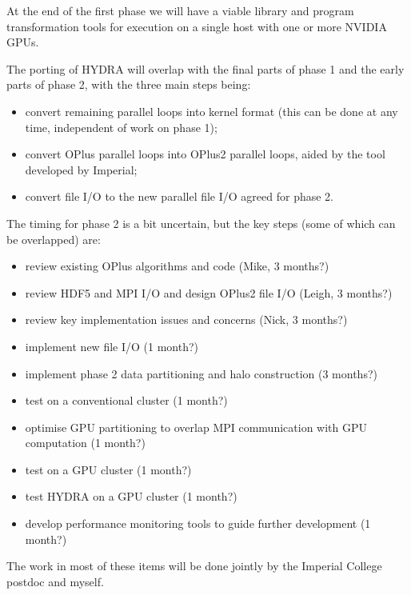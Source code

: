 \documentclass[12pt]{article}
\begin{document}

At the end of the first phase we will have a viable library 
and program transformation tools for execution on a single host 
with one or more NVIDIA GPUs.  

The porting of HYDRA will overlap with the final parts of phase 1 
and the early parts of phase 2, with the three main steps being:
\begin{itemize}
\item
convert remaining parallel loops into kernel format
(this can be done at any time, independent of work on phase 1);

\item
convert OPlus parallel loops into OPlus2 parallel loops,
aided by the tool developed by Imperial;

\item
convert file I/O to the new parallel file I/O agreed for phase 2.
\end{itemize}

\noindent
The timing for phase 2 is a bit uncertain, but the key steps 
(some of which can be overlapped) are:
\begin{itemize}
\item
review existing OPlus algorithms and code (Mike, 3 months?)

\item
review HDF5 and MPI I/O and design OPlus2 file I/O (Leigh, 3 months?)

\item
review key implementation issues and concerns (Nick, 3 months?)

\item
implement new file I/O (1 month?)

\item
implement phase 2 data partitioning and halo construction 
(3 months?)

\item
test on a conventional cluster (1 month?)

\item
optimise GPU partitioning to overlap MPI communication with GPU 
computation (1 month?)

\item
test on a GPU cluster (1 month?)

\item
test HYDRA on a GPU cluster (1 month?)

\item
develop performance monitoring tools to guide further development 
(1 month?)
\end{itemize}
The work in most of these items will be done jointly by the 
Imperial College postdoc and myself.
\end{document}
